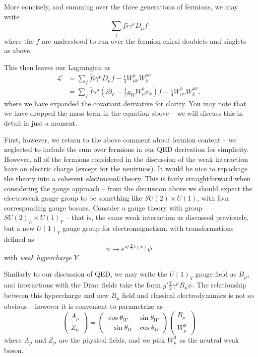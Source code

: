 More concisely, and summing over the three generations of fermions, we may write
\begin{equation}
\sum\limits_{f} \bar{f}i\gamma^{\mu}D_{\mu}f
\end{equation}
where the $f$ are understood to run over the fermion chiral doublets and singlets as above.

This then leaves our Lagrangian as
\begin{align}
\mathcal{L} &= \sum\limits_{f} \bar{f}i\gamma^{\mu}D_{\mu}f -\frac{1}{4} W_{\mu\nu}^{k}W^{\mu\nu}_{k}\\
&= \sum\limits_{f} \bar{f}\gamma^{\mu}(i\partial_{\mu} -\frac{1}{2}g_{W}W_{\mu}^{k}\sigma_{k})f -\frac{1}{4} W_{\mu\nu}^{k}W^{\mu\nu}_{k},
\end{align}
where we have expanded the covariant derivative for clarity. You may note that we have dropped the mass term in the equation 
above -- we will discuss this in detail in just a moment. 

First, however, we return to the above comment about fermion content -- we neglected to include the sum over fermions
in our QED derivation for simplicity. However, all of the fermions considered in the discussion of the weak 
interaction have an electric charge (except for the neutrinos). It would be nice to repackage the theory into a coherent
\emph{electroweak} theory. This is fairly straightforward when considering the gauge approach -- from the discussion 
above we should expect the electroweak gauge group to be something like $SU(2) \times U(1)$, with four corresponding gauge bosons. 
Consider a gauge theory with group $SU(2)_L \times U(1)_{Y}$ -- that is, the same weak interaction as discussed 
previously, but a new $U(1)_{Y}$ gauge group for electromagnetism, with transformations defined as
\begin{equation}
\psi\rightarrow e^{ig'\frac{Y}{2}\lambda(x)}\psi
\end{equation}
with \emph{weak hypercharge} $Y$.

Similarly to our discussion of QED, we may write the $U(1)_{Y}$ gauge field as $B_{\mu}$, and interactions with 
the Dirac fields take the form $g'\frac{Y}{2}\gamma^{\mu}B_{\mu}\psi$. The relationship between this hypercharge 
and new $B_{\mu}$ field and classical electrodynamics is not so obvious -- however it is convenient to parametrize
as 
\begin{equation}
\begin{pmatrix}A_{\mu}\\Z_{\mu}\end{pmatrix} = 
\begin{pmatrix}\cos\theta_{W} & \sin\theta_{W}\\-\sin\theta_{W} & \cos\theta_{W}\end{pmatrix}
\begin{pmatrix}B_{\mu}\\W_{\mu}^{3}\end{pmatrix}
\end{equation}
where $A_{\mu}$ and $Z_{\mu}$ are the physical fields, and we pick $W_{\mu}^{3}$ as the neutral weak boson.

